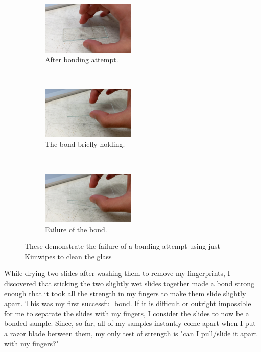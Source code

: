 \documentclass[colorlinks=true,pdfstartview=FitV,linkcolor=blue,
            citecolor=red,urlcolor=magenta]{ligodoc}
\begin{document}
\begin{figure}[t!]
    \centering
    \begin{subfigure}[t]{0.3\textwidth}
        \centering
        \includegraphics[width=1.75in]{graphics/kimwipe_before_PXL_20220712_003150428_exported_33.jpg}
        \caption{After bonding attempt.}
    \end{subfigure}%
    ~ 
    \begin{subfigure}[t]{0.3\textwidth}
        \centering
        \includegraphics[width=1.75in]{graphics/kimwipe_during_PXL_20220712_003150428_exported_3069.jpg}
        \caption{The bond briefly holding.}
    \end{subfigure}%
    ~ 
    \begin{subfigure}[t]{0.3\textwidth}
        \centering
        \includegraphics[width=1.75in]{graphics/kimwipe_after_PXL_20220712_003150428_exported_3069.jpg}
        \caption{Failure of the bond.}
    \end{subfigure}%
    \caption{These demonstrate the failure of a bonding attempt using just Kimwipes to clean the glass}
    \label{fig:kimwipe_bond}
\end{figure}

While drying two slides after washing them to remove my fingerprints, I discovered that sticking the two slightly wet slides together made a bond strong enough that it took all the strength in my fingers to make them slide slightly apart. This was my first successful bond. If it is difficult or outright impossible for me to separate the slides with my fingers, I consider the slides to now be a bonded sample. Since, so far, all of my samples instantly come apart when I put a razor blade between them, my only test of strength is "can I pull/slide it apart with my fingers?"
\end{document}
